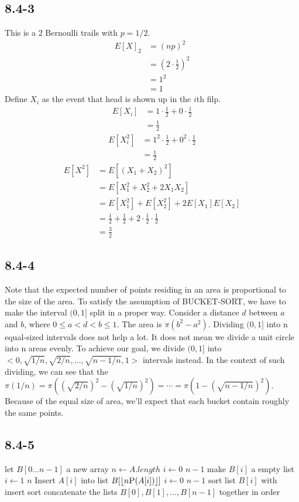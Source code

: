 \documentclass{book}
\begin{document}
\begin{CJK}{UTF8}{gkai}
\subsection*{8.4-3} This is a 2 Bernoulli trails with $p=1/2$.
\begin{align*}
E[X]_2 & = (np)^2 \\
& = (2 \cdot \frac{1}{2})^2 \\
&= 1^2 \\
& = 1
\end{align*}
Define $X_i$ as the event that head is shown up in the $i$th filp.
\begin{align*}
E[X_i] & = 1 \cdot \frac{1}{2} + 0 \cdot \frac{1}{2} \\
& = \frac{1}{2}
\end{align*}
\begin{align*}
E[X_i^2] & = 1^2 \cdot \frac{1}{2} + 0^2 \cdot \frac{1}{2} \\
& = \frac{1}{2}
\end{align*}
\begin{align*}
E[X^2] & = E[(X_1+X_2)^2] \\
& = E[X_1^2+X_2^2+2X_1 X_2] \\
& = E[X_1^2] + E[X_2^2] + 2 E[X_1] E[X_2] \\
& = \frac{1}{2} + \frac{1}{2} + 2 \cdot \frac{1}{2} \cdot \frac{1}{2} \\
& = \frac{3}{2}
\end{align*}

\subsection*{8.4-4}
Note that the expected number of points residing in an area is proportional to 
the size of the area. To satisfy the assumption of BUCKET-SORT, we have to make 
the interval $(0, 1]$ split in a proper way. Consider a distance $d$ between $a$ 
and $b$, where $0 \leq a < d < b \leq 1$. The area is $\pi(b^2 - a^2)$. Dividing 
$(0, 1]$ into n equal-sized intervals does not help a lot. It does not mean we 
divide a unit circle into n areas evenly. To achieve our goal, we divide $(0, 
1]$ into $<0, \sqrt{1/n}, \sqrt{2/n}, \ldots, \sqrt{n-1/n}, 1>$ intervals 
instead. In the context of such dividing, we can see that the $\pi(1/n) = 
\pi((\sqrt{2/n})^2 - (\sqrt{1/n})^2) = \cdots = \pi(1 - (\sqrt{n-1/n})^2)$. 
Because of the equal size of area, we'll expect that each bucket contain roughly 
the same points.

\subsection*{8.4-5}
\begin{codebox}
\li let $B[0\dots n-1]$ a new array
\li $n \gets A.length$
\li \For $i \gets 0$ \To $n-1$
\li \Do make $B[i]$ a empty list
\End
\li \For $i\gets 1$ \To $n$
\li \Do Insert $A[i]$ into list $B[\lfloor n \textnormal{\scshape P}(A[i] )\rfloor]$
\End
\li \For $i \gets 0$ \To $n-1$
\li \Do sort list $B[i]$ with insert sort
\End
\li concatenate the lists $B[0], B[1], \dots, B[n-1]$ together in order
\end{codebox}


\end{CJK}
\end{document}
